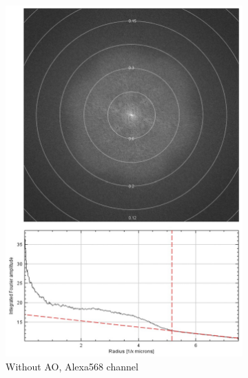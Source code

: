 \begin{figure}
	
	\begin{subfigure}[t]{0.45\textwidth}
		\centering
		\includegraphics[width=\linewidth]{images/DeepSIM_NMJ_woAO_Alexa568_ft_and_plot.jpg}
		\caption{Without AO, Alexa568 channel}
		\label{fig:DeepSIM_NMJ_woAO_Alexa568_ft_and_plot}
	\end{subfigure}
	\begin{subfigure}[t]{0.45\textwidth}
		\centering

\end{subfigure}
\end{figure}
